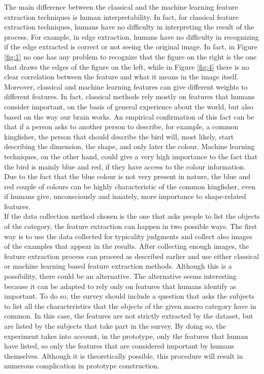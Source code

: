 \documentclass[conference]{IEEEtran}
\begin{document}
			\noindent The main difference between the classical and the machine learning feature extraction techniques is human interpretability. 
			In fact, for classical feature extraction techniques, humans have no difficulty in interpreting the result of the process. For example, in edge extraction, humans have no difficulty in recognizing if the 
			edge extracted is correct or not seeing the original image. In fact, in Figure \ref{fig:1} no one has any problem to recognize that the figure on the right is the one that draws the edges of the figure on the left, 
			while in Figure \ref{fig:4} there is no clear correlation between the feature and what it means in the image itself.
			Moreover, classical and machine learning features can give different weights to different features. 
			In fact, classical methods rely mostly on features that humans consider important, on the basis of general experience about the world, but also based on the way our brain works. An empirical confirmation of this fact 
			can be that if a person asks to another person to describe, for example, a common kingfisher, the person that should describe the bird will, most likely, start describing the dimension, the shape, and only 
			later the colour. Machine learning techniques, on the other hand, could give a very high importance to the fact that the bird is mainly blue and red, if they have access to the colour information. Due to the fact that 
			the blue colour is not very present in nature, the blue and red couple of colours can be highly characteristic of the common kingfisher, even if humans give, unconsciously and innately, more importance to 
			shape-related features.	\\
			If the data collection method chosen is the one that asks people to list the objects of the category, the feature extraction can happen in two possible ways. The first way is to use the data collected for 
			typicality judgments and collect also images of the examples that appear in the results. After collecting enough images, the feature extraction process can proceed as described earlier and use either  
			classical or machine learning based feature extraction methods. Although this is a possibility, there could be an alternative. The alternative seems interesting because it can be adapted to rely only on features 
			that humans identify as important. To do so, the survey should include a question that asks the subjects to list all the characteristics that the objects of the given macro category have in common. In this case, 
			the features are not strictly extracted by the dataset, but are listed by the subjects that take part in the survey. By doing so, the experiment takes into account, in the prototype, only the features that 
			human have listed, so only the features that are considered important by humans themselves. Although it is theoretically possible, this procedure will result in numerous complication in prototype construction. 
		
\end{document}
